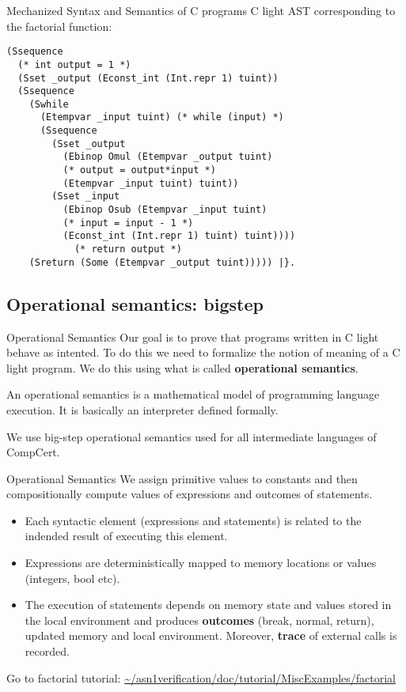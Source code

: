 \documentclass[10pt]{beamer}
\begin{document}
\begin{frame}[fragile]{Mechanized Syntax and Semantics of C programs}
C light AST corresponding to the factorial function: 
  \begin{lstlisting}[language=Coq]
(Ssequence
  (* int output = 1 *)
  (Sset _output (Econst_int (Int.repr 1) tuint)) 
  (Ssequence 
    (Swhile 
      (Etempvar _input tuint) (* while (input) *)
      (Ssequence  
        (Sset _output
          (Ebinop Omul (Etempvar _output tuint) 
          (* output = output*input *)
          (Etempvar _input tuint) tuint)) 
        (Sset _input
          (Ebinop Osub (Etempvar _input tuint) 
          (* input = input - 1 *)
          (Econst_int (Int.repr 1) tuint) tuint))))
            (* return output *)
    (Sreturn (Some (Etempvar _output tuint))))) |}.
     \end{lstlisting}
     
\end{frame}


\subsection{Operational semantics: bigstep}

  \begin{frame}{Operational Semantics}
    Our goal is to prove that programs written in C light behave as intented. To do this we need to formalize the notion of meaning of a C light program. We do this using what is called {\bf operational semantics}.

    \bigskip
    
    An operational semantics is a mathematical model of programming language execution. It is basically an interpreter defined formally.
    \bigskip
    
    We use big-step operational semantics used for all intermediate languages of CompCert.
  \end{frame}
  \begin{frame}{Operational Semantics}
    We assign primitive values to constants and then compositionally compute values of expressions and outcomes of statements.
   \begin{itemize}
    \item Each syntactic element (expressions and statements) is related to the indended result of executing this element.    
    \item Expressions are deterministically mapped to memory locations or values (integers, bool etc).
    \item The execution of statements depends on memory state and values stored in the local environment and produces {\bf outcomes} (break, normal, return), updated memory and local environment. Moreover, {\bf trace} of external calls is recorded.
      \end{itemize}
    \end{frame}
    \begin{frame}
      Go to factorial tutorial: \url{~/asn1verification/doc/tutorial/MiscExamples/factorial}
    \end{frame}
\end{document}
